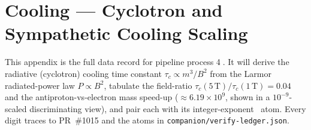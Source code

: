 \section{Cooling --- Cyclotron and Sympathetic Cooling Scaling}
\label{app:cooling}

This appendix is the full data record for pipeline process
\textcircled{\scriptsize 4}. It will derive the radiative (cyclotron)
cooling time constant $\tau_c\propto m^3/B^2$ from the Larmor radiated-power
law $P\propto B^2$, tabulate the field-ratio
$\tau_c(5\,\mathrm{T})/\tau_c(1\,\mathrm{T})=0.04$ and the antiproton-vs-electron
mass speed-up ($\approx6.19\!\times\!10^9$, shown in a $10^{-9}$-scaled
discriminating view), and pair each with its integer-exponent
\tierBlue\ atom. Every digit traces to PR~\#1015 and the atoms in
\texttt{companion/verify-ledger.json}.

